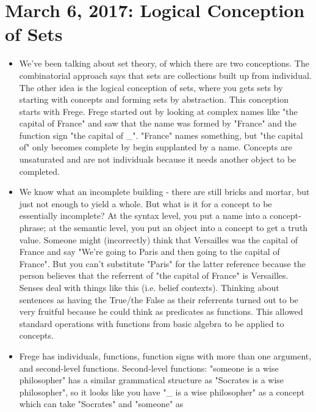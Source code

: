 \documentclass[12pt]{article}
\theoremstyle{definition}
\begin{document}
\section{March 6, 2017: Logical Conception of Sets}

\begin{itemize}
    \itemsep0em 
    \item
        We've been talking about set theory, of which there are two
        conceptions. The combinatorial approach says that sets are collections
        built up from individual. The other idea is the logical conception of
        sets, where you gets sets by starting with concepts and forming sets by
        abstraction. This conception starts with Frege. Frege started out by
        looking at complex names like "the capital of France" and saw that the
        name was formed by "France" and the function sign "the capital of \_".
        "France" names something, but "the capital of" only becomes complete by
        begin supplanted by a name. Concepts are unsaturated and are not
        individuals because it needs another object to be completed. 
    \item
        We know what an incomplete building - there are still bricks and
        mortar, but just not enough to yield a whole. But what is it for a
        concept to be essentially incomplete? At the syntax level, you put a
        name into a concept-phrase; at the semantic level, you put an object
        into a concept to get a truth value. Someone might (incorrectly) think
        that Versailles was the capital of France and say "We're going to Paris
        and then going to the capital of France". But you can't substitute
        "Paris" for the latter reference because the person believes that the
        referrent of "the capital of France" is Versailles. Senses deal with
        things like this (i.e. belief contexts). Thinking about sentences as
        having the True/the False as their referrents turned out to be very
        fruitful because he could think as predicates as functions. This
        allowed standard operations with functions from basic algebra to be
        applied to concepts.
    \item
        Frege has individuals, functions, function signs with more than one
        argument, and second-level functions. Second-level functions: "someone
        is a wise philosopher" has a similar grammatical structure as "Socrates
        is a wise philosopher", so it looks like you have "\_ is a wise
        philosopher" as a concept which can take "Socrates" and "someone" as

\end{itemize}
\end{document}
